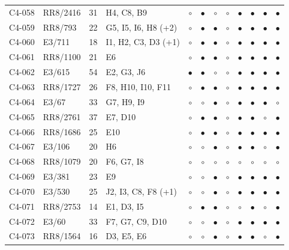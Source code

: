 {\begin{longtable}{llrp{3.9cm}cccccccc}
    C4-058 & RR8/2416 & 31 & H4, C8, B9 & $\circ$ & $\bullet$ & $\circ$ & $\circ$ & $\bullet$ & $\bullet$ & $\bullet$ & $\bullet$ \\
    C4-059 & RR8/793 & 22 & G5, I5, I6, H8 (+2) & $\circ$ & $\bullet$ & $\bullet$ & $\circ$ & $\bullet$ & $\bullet$ & $\bullet$ & $\bullet$ \\
    C4-060 & E3/711 & 18 & I1, H2, C3, D3 (+1) & $\circ$ & $\bullet$ & $\bullet$ & $\circ$ & $\bullet$ & $\bullet$ & $\bullet$ & $\bullet$ \\
    C4-061 & RR8/1100 & 21 & E6 & $\circ$ & $\bullet$ & $\bullet$ & $\circ$ & $\bullet$ & $\bullet$ & $\bullet$ & $\bullet$ \\
    C4-062 & E3/615 & 54 & E2, G3, J6 & $\bullet$ & $\bullet$ & $\circ$ & $\circ$ & $\bullet$ & $\bullet$ & $\bullet$ & $\bullet$ \\
    C4-063 & RR8/1727 & 26 & F8, H10, I10, F11 & $\circ$ & $\bullet$ & $\bullet$ & $\circ$ & $\bullet$ & $\bullet$ & $\bullet$ & $\bullet$ \\
    C4-064 & E3/67 & 33 & G7, H9, I9 & $\circ$ & $\circ$ & $\bullet$ & $\circ$ & $\bullet$ & $\bullet$ & $\bullet$ & $\circ$ \\
    C4-065 & RR8/2761 & 37 & E7, D10 & $\circ$ & $\bullet$ & $\bullet$ & $\circ$ & $\bullet$ & $\bullet$ & $\circ$ & $\bullet$ \\
    C4-066 & RR8/1686 & 25 & E10 & $\circ$ & $\bullet$ & $\bullet$ & $\circ$ & $\bullet$ & $\bullet$ & $\bullet$ & $\bullet$ \\
    C4-067 & E3/106 & 20 & H6 & $\circ$ & $\circ$ & $\bullet$ & $\circ$ & $\bullet$ & $\bullet$ & $\circ$ & $\bullet$ \\
    C4-068 & RR8/1079 & 20 & F6, G7, I8 & $\circ$ & $\circ$ & $\circ$ & $\circ$ & $\circ$ & $\circ$ & $\circ$ & $\circ$ \\
    C4-069 & E3/381 & 23 & E9 & $\circ$ & $\circ$ & $\bullet$ & $\circ$ & $\bullet$ & $\bullet$ & $\bullet$ & $\bullet$ \\
    C4-070 & E3/530 & 25 & J2, I3, C8, F8 (+1) & $\circ$ & $\circ$ & $\bullet$ & $\circ$ & $\bullet$ & $\bullet$ & $\bullet$ & $\bullet$ \\
    C4-071 & RR8/2753 & 14 & E1, D3, I5 & $\circ$ & $\bullet$ & $\bullet$ & $\circ$ & $\circ$ & $\bullet$ & $\circ$ & $\bullet$ \\
    C4-072 & E3/60 & 33 & F7, G7, C9, D10 & $\circ$ & $\circ$ & $\bullet$ & $\circ$ & $\bullet$ & $\bullet$ & $\bullet$ & $\bullet$ \\
    C4-073 & RR8/1564 & 16 & D3, E5, E6 & $\circ$ & $\circ$ & $\bullet$ & $\circ$ & $\bullet$ & $\bullet$ & $\circ$ & $\bullet$ \\

\end{longtable}}
